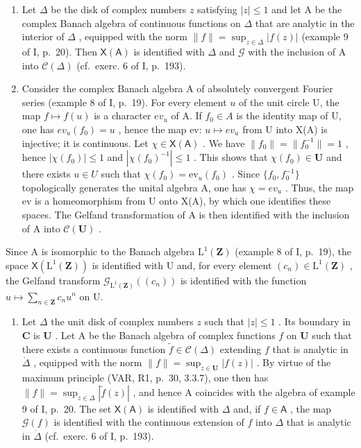 \begin{enumerate}
\def\labelenumi{\arabic{enumi})}
\setcounter{enumi}{2}
\item
  Let \(\Delta\) be the disk of complex numbers \(z\) satisfying \(|z| \leqslant 1\) and let A be the complex Banach algebra of continuous functions on \(\Delta\) that are analytic in the interior of \(\Delta\) , equipped with the norm \(\|f\| = \sup_{z \in \Delta} |f(z)|\) (example 9 of I, p.~20). Then \(\mathsf{X}(\mathsf{A})\) is identified with \(\Delta\) and \(\mathcal{G}\) with the inclusion of A into \(\mathcal{C}(\Delta)\) (cf.~exerc. 6 of I, p.~193).
\item
  Consider the complex Banach algebra A of absolutely convergent Fourier series (example 8 of I, p.~19). For every element \(u\) of the unit circle U, the map \(f \mapsto f(u)\) is a character \(ev_{u}\) of A. If \(f_{0} \in A\) is the identity map of U, one has \(ev_{u}(f_{0}) = u\) , hence the map ev: \(u \mapsto ev_{u}\) from U into X(A) is injective; it is continuous. Let \(\chi \in \mathsf{X}(\mathsf{A})\) . We have \(\|f_{0}\| = \|f_{0}^{-1}\| = 1\) , hence \(|\chi(f_{0})| \leqslant 1\) and \(|\chi(f_{0})^{-1}| \leqslant 1\) . This shows that \(\chi(f_{0}) \in \mathbf{U}\) and there exists \(u \in U\) such that \(\chi(f_{0}) = \mathrm{ev}_{u}(f_{0})\) . Since \(\{f_{0}, f_{0}^{-1}\}\) topologically generates the unital algebra A, one has \(\chi = ev_{u}\) . Thus, the map ev is a homeomorphism from U onto X(A), by which one identifies these spaces. The Gelfand transformation of A is then identified with the inclusion of A into \(\mathcal{C}(\mathbf{U})\) .
\end{enumerate}

Since A is isomorphic to the Banach algebra \(\mathrm{L}^{1}(\mathbf{Z})\) (example 8 of I, p.~19), the space \(\mathsf{X}(\mathrm{L}^{1}(\mathbf{Z}))\) is identified with U and, for every element \((c_{n})\in\mathrm{L}^{1}(\mathbf{Z})\) , the Gelfand transform \(\mathcal{G}_{\mathrm{L}^{1}(\mathbf{Z})}((c_{n}))\) is identified with the function \(u\mapsto\sum_{n\in\mathbf{Z}}c_{n}u^{n}\) on U.

\begin{enumerate}
\def\labelenumi{\arabic{enumi})}
\setcounter{enumi}{4}
\tightlist
\item
  Let \(\Delta\) the unit disk of complex numbers \(z\) such that \(|z| \leqslant 1\) . Its boundary in \(\mathbf{C}\) is \(\mathbf{U}\) . Let A be the Banach algebra of complex functions \(f\) on \(\mathbf{U}\) such that there exists a continuous function \(\widetilde{f} \in \mathcal{C}(\Delta)\) extending \(f\) that is analytic in \(\mathring{\Delta}\) , equipped with the norm \(\|f\| = \sup_{z \in \mathbf{U}} |f(z)|\) . By virtue of the maximum principle (VAR, R1, p.~30, 3.3.7), one then has \(\|f\| = \sup_{z \in \Delta} |\widetilde{f}(z)|\) , and hence A coincides with the algebra of example 9 of I, p.~20. The set \(\mathsf{X}(\mathsf{A})\) is identified with \(\Delta\) and, if \(f \in \mathsf{A}\) , the map \(\mathcal{G}(f)\) is identified with the continuous extension of \(f\) into \(\Delta\) that is analytic in \(\mathring{\Delta}\) (cf.~exerc. 6 of I, p.~193).
\end{enumerate}

